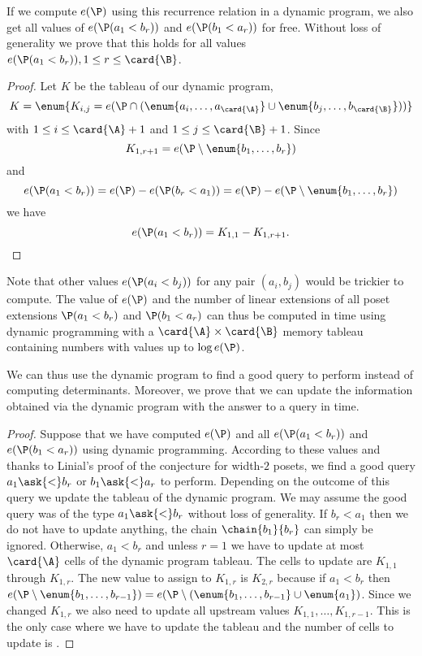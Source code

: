 If we compute \(e(\P)\) using this recurrence relation in a dynamic program,
we also get all values of \(e(\P(a_1 < b_r))\) and \(e(\P(b_1 < a_r))\) for
free. Without loss of generality we prove that this holds for all
values \(e(\P(a_1 < b_r)), 1 \le r \le \card{\B}\).
\begin{proof}
Let \(K\) be the tableau of our dynamic program, \ie
\begin{displaymath}
K = \enum{K_{i,j} = e(\P \cap (\enum{a_i,\ldots,a_{\card{\A}}} \cup
\enum{b_j,\ldots,b_{\card{\B}}}))}
\end{displaymath}
with \(1 \le i \le \card{\A}+1\) and \(1 \le j \le \card{\B}+1\). Since
\begin{displaymath}
K_{1,r+1} = e(\P \setminus \enum{b_1,\ldots,b_r})
\end{displaymath}
and
\begin{displaymath}
e(\P(a_1 < b_r)) = e(\P) - e(\P(b_r < a_1)) = e(\P) - e(\P \setminus \enum{b_1,\ldots,b_r})
\end{displaymath}
we have
\begin{displaymath}
e(\P(a_1 < b_r)) = K_{1,1} - K_{1,r+1}.\qedhere
\end{displaymath}
\end{proof}
Note that other values \(e(\P(a_i < b_j))\) for any pair \((a_i,b_j)\)
would be trickier to compute. The value of \(e(\P)\) and the number of linear
extensions of all poset extensions \(\P(a_1 < b_r)\) and \(\P(b_1 < a_r)\) can
thus be computed in  time using dynamic programming with a
\(\card{\A} \times \card{\B}\) memory tableau containing numbers with values up to \(\log
e(\P)\).

We can thus use the dynamic program to find a good query to perform instead of
computing determinants.
Moreover, we prove that we can update the information obtained via the dynamic program
with the answer to a query in  time.
\begin{proof}
Suppose that we have computed \(e(\P)\) and all \(e(\P(a_1 < b_r))\) and
\(e(\P(b_1 < a_r))\) using dynamic programming. According to these values and
thanks to Linial's proof of the \onethirdtwothird conjecture for width-\(2\)
posets, we find a good query \(a_1 \ask{<} b_r\) or \(b_1 \ask{<} a_r\) to perform.
Depending on the outcome of this query we update the tableau of the dynamic
program. We may assume the good query was of the type \(a_1 \ask{<} b_r\)
without loss of generality. If \(b_r < a_1\) then we do not have to update anything,
the chain \(\chain{b_1}{b_r}\) can simply be ignored. Otherwise, \(a_1 <
b_r\) and
unless \(r = 1\) we have to update at most \(\card{\A}\) cells of the dynamic program
tableau. The
cells to update are \(K_{1,1}\) through \(K_{1,r}\). The
new value to assign to \(K_{1,r}\) is \(K_{2,r}\) because if \(a_1 < b_r\)
then \(e(\P \setminus
\enum{b_1,\ldots,b_{r-1}}) = e(\P \setminus (\enum{b_1,\ldots,b_{r-1}} \cup
\enum{a_1})\). Since we changed \(K_{1,r}\) we also need to update all upstream
values \(K_{1,1}, \ldots, K_{1,r-1}\). This is the only case where we have to
update the tableau and the number of cells to update is .
\end{proof}

